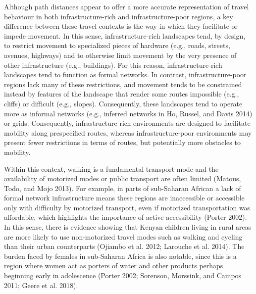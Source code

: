 \documentclass[]{elsarticle} %
\begin{document}
Although path distances appear to offer a more accurate representation
of travel behaviour in both infrastructure-rich and infrastructure-poor
regions, a key difference between these travel contexts is the way in
which they facilitate or impede movement. In this sense,
infrastructure-rich landscapes tend, by design, to restrict movement to
specialized pieces of hardware (e.g., roads, streets, avenues, highways)
and to otherwise limit movement by the very presence of other
infrastructure (e.g., buildings). For this reason, infrastructure-rich
landscapes tend to function as formal networks. In contrast,
infrastructure-poor regions lack many of these restrictions, and
movement tends to be constrained instead by features of the landscape
that render some routes impossible (e.g., cliffs) or difficult (e.g.,
slopes). Consequently, these landscapes tend to operate more as informal
networks (e.g., inferred networks in Ho, Russel, and Davis 2014) or
grids. Consequently, infrastructure-rich environments are designed to
facilitate mobility along prespecified routes, whereas
infrastructure-poor environments may present fewer restrictions in terms
of routes, but potentially more obstacles to mobility.

Within this context, walking is a fundamental transport mode and the
availability of motorized modes or public transport are often limited
(Matous, Todo, and Mojo 2013). For example, in parts of sub-Saharan
African a lack of formal network infrastructure means these regions are
inaccessible or accessible only with difficulty by motorized transport,
even if motorized transportation was affordable, which highlights the
importance of active accessibility (Porter 2002). In this sense, there
is evidence showing that Kenyan children living in rural areas are more
likely to use non-motorized travel modes such as walking and cycling
than their urban counterparts (Ojiambo et al. 2012; Larouche et al.
2014). The burden faced by females in sub-Saharan Africa is also
notable, since this is a region where women act as porters of water and
other products perhaps beginning early in adolescence (Porter 2002;
Sorenson, Morssink, and Campos 2011; Geere et al. 2018).
\end{document}
